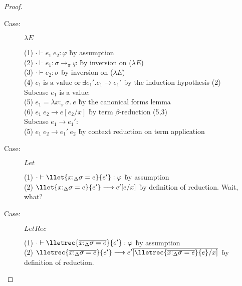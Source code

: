 \begin{proof}
\begin{description}
\item[Case:] $\lambda E$
\begin{tabbing}
(1) $\cdot \vdash e_1~e_2 : \varphi$ \` by assumption \\
(2) $\cdot \vdash e_1 : \sigma \to_\pi \varphi$ \` by inversion on ($\lambda E$) \\
(3) $\cdot \vdash e_2 : \sigma$ \` by inversion on ($\lambda E$) \\
(4) $e_1~\textrm{is a value or}~\exists e_1'. e_1\longrightarrow e_1'$ \` by the induction hypothesis (2) \\
\textrm{Subcase $e_1$ is a value:}\\
(5) $e_1 = \lambda x{:}_\pi\sigma.~e$ \` by the canonical forms lemma \\
(6) $e_1~e_2 \longrightarrow e[e_2/x]$ \` by term $\beta$-reduction (5,3) \\
\textrm{Subcase $e_1\longrightarrow e_1'$:}\\
(5) $e_1~e_2\longrightarrow e_1'~e_2$ \` by context reduction on term application \\
\end{tabbing}

\item[Case:] $Let$
\begin{tabbing}
(1) $\cdot \vdash \llet{x{:}_\Delta\sigma = e}{e'} : \varphi$ \` by assumption \\
(2) $\llet{x{:}_\Delta\sigma = e}{e'}\longrightarrow e'[e/x]$ \` by definition of reduction. Wait, what? \\
\end{tabbing}

\item[Case:] $LetRec$
\begin{tabbing}
(1) $\cdot \vdash \lletrec{\overline{x{:}_\Delta\sigma = e}}{e'} : \varphi$ \` by assumption \\
(2) $\lletrec{\overline{x{:}_\Delta\sigma = e}}{e'} \longrightarrow e'\overline{[\lletrec{\overline{x{:}_\Delta\sigma = e}}{e}/x]}$ \` by definition of reduction. \\
\end{tabbing}


\end{description}
\end{proof}
